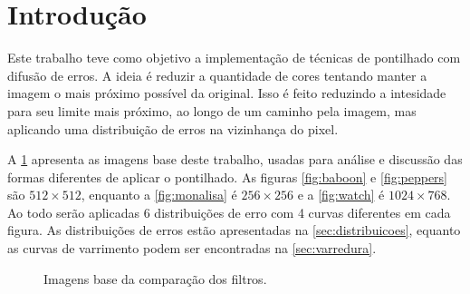 \section{Introdução} \label{sec:intro}

Este trabalho teve como objetivo a implementação de técnicas de pontilhado com difusão de erros. A ideia é reduzir a quantidade de cores tentando manter a imagem o mais próximo possível da original. Isso é feito reduzindo a intesidade para seu limite mais próximo, ao longo de um caminho pela imagem, mas aplicando uma distribuição de erros na vizinhança do pixel.

A \cref{fig:base} apresenta as imagens base deste trabalho, usadas para análise e discussão das formas diferentes de aplicar o pontilhado. As figuras \ref{fig:baboon} e \ref{fig:peppers} são $512 \times 512$, enquanto a \cref{fig:monalisa} é $256 \times 256$ e a \cref{fig:watch} é $1024 \times 768$. Ao todo serão aplicadas 6 distribuições de erro com 4 curvas diferentes em cada figura. As distribuições de erros estão apresentadas na \cref{sec:distribuicoes}, equanto as curvas de varrimento podem ser encontradas na \cref{sec:varredura}.

\begin{figure}[H]
    \centering
    

    \caption{Imagens base da comparação dos filtros.}
    \label{fig:base}
\end{figure}
